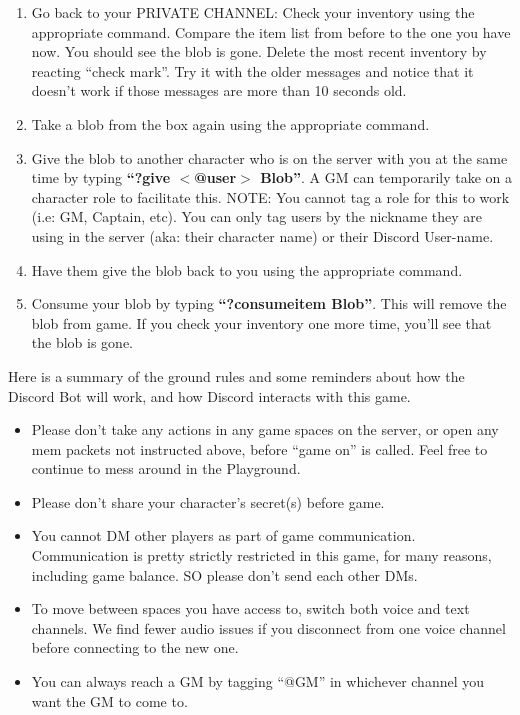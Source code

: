 \documentclass[green]{TMFHope}
\begin{document}
\begin{enumerate}
	\item Go back to your PRIVATE CHANNEL: Check your inventory using the appropriate command. Compare the item list from before to the one you have now. You should see the blob is gone. Delete the most recent inventory by reacting ``check mark''. Try it with the older messages and notice that it doesn't work if those messages are more than 10 seconds old.
	\item Take a blob from the box again using the appropriate command.
	\item Give the blob to another character who is on the server with you at the same time by typing \textbf{``?give $<$@user$>$ Blob''}. A GM can temporarily take on a character role to facilitate this. NOTE: You cannot tag a role for this to work (i.e: GM, Captain, etc). You can only tag users by the nickname they are using in the server (aka: their character name) or their Discord User-name.
	\item Have them give the blob back to you using the appropriate command.
	\item Consume your blob by typing \textbf{``?consumeitem Blob''}. This will remove the blob from game. If you check your inventory one more time, you'll see that the blob is gone.
\end{enumerate}

Here is a summary of the ground rules and some reminders about how the Discord Bot will work, and how Discord interacts with this game.
\begin{itemize}
	\item Please don't take any actions in any game spaces on the server, or open any mem packets not instructed above, before ``game on'' is called. Feel free to continue to mess around in the Playground.
	\item Please don't share your character's secret(s) before game.
	\item You cannot DM other players as part of game communication. Communication is pretty strictly restricted in this game, for many reasons, including game balance. SO please don't send each other DMs.
	\item To move between spaces you have access to, switch both voice and text channels. We find fewer audio issues if you disconnect from one voice channel before connecting to the new one.
	\item You can always reach a GM by tagging ``@GM'' in whichever channel you want the GM to come to.
\end{itemize}
\end{document}
